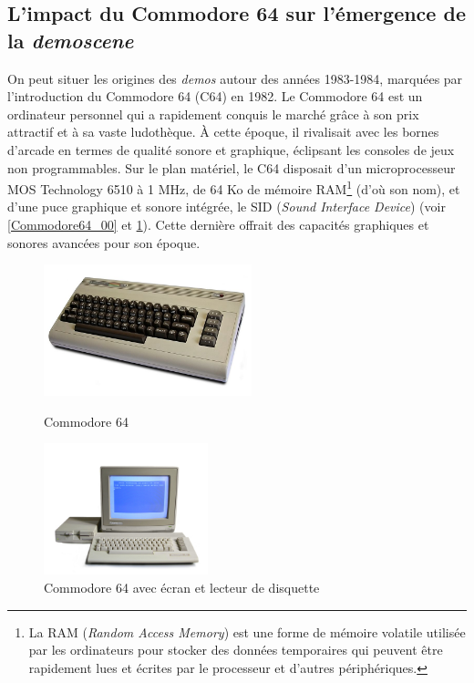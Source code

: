 \subsection*{L'impact du Commodore 64 sur l'émergence de la \textit{demoscene}}


On peut situer les origines des \textit{demos} autour des années 1983-1984, marquées par l'introduction du Commodore 64 (C64) en 1982. Le Commodore 64  est un ordinateur personnel qui a rapidement conquis le marché grâce à son prix attractif et à sa vaste ludothèque. À cette époque, il rivalisait avec les bornes d'arcade en termes de qualité sonore et graphique, éclipsant les consoles de jeux non programmables. Sur le plan matériel, le C64 disposait d'un microprocesseur MOS Technology 6510 à 1 MHz, de 64 Ko de mémoire RAM\footnote{La RAM (\textit{Random Access Memory}) est une forme de mémoire volatile utilisée par les ordinateurs pour stocker des données temporaires qui peuvent être rapidement lues et écrites par le processeur et d'autres périphériques.} (d'où son nom), et d'une puce graphique et sonore intégrée, le SID (\textit{Sound Interface Device}) (voir \ref{Commodore64_00} et \ref{Commodore64_01}). Cette dernière offrait des capacités graphiques et sonores avancées pour son époque.

\begin{figure}[h]
  \begin{minipage}[b]{0.40\linewidth}
    \centering
    \includegraphics[width=\linewidth, height=1.5in]{images/demoscene/Commodore64_00.jpg}
    \caption{Commodore 64}
    \label{Commodore64_00}
  \end{minipage}
  \hspace{0.1\linewidth} %
  \begin{minipage}[b]{0.40\linewidth}
    \centering
    \includegraphics[width=\linewidth, height=1.5in]{images/demoscene/Commodore64_01.jpg}
    \caption{Commodore 64 avec écran et lecteur de disquette}
    \label{Commodore64_01}
  \end{minipage}
\end{figure}


